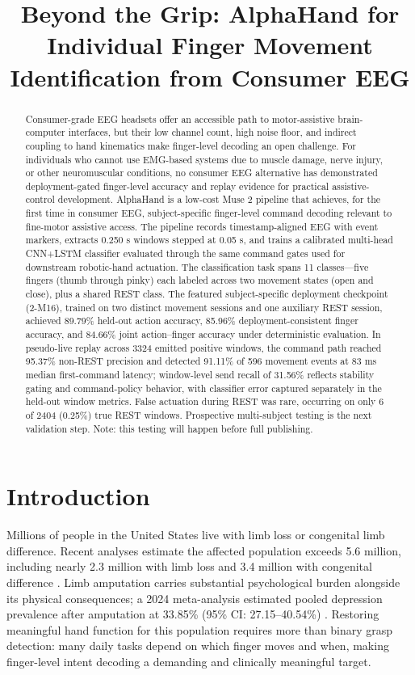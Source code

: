 \documentclass[conference]{IEEEtran}
\title{
Beyond the Grip:
AlphaHand for Individual Finger Movement Identification from Consumer EEG
}
\author{
\IEEEauthorblockN{\textbf{Jonathan Davanzo}}
\IEEEauthorblockA{
\normalfont\footnotesize First author and lead researcher\\
Summit High School\\
jonathandavanzo@alphahand.org}
\and
\IEEEauthorblockN{\textbf{Liam Bales}}
\IEEEauthorblockA{
\normalfont\footnotesize Summit High School\\
liam.c.bales@gmail.com}
\and
\IEEEauthorblockN{\textbf{Oliver Buchanan}}
\IEEEauthorblockA{
\normalfont\footnotesize Summit High School\\
oliverpbuchanan@icloud.com}
}
\begin{document}
\maketitle

\begin{abstract}
Consumer-grade EEG headsets offer an accessible path to motor-assistive brain-computer interfaces, but their low channel count, high noise floor, and indirect coupling to hand kinematics make finger-level decoding an open challenge. For individuals who cannot use EMG-based systems due to muscle damage, nerve injury, or other neuromuscular conditions, no consumer EEG alternative has demonstrated deployment-gated finger-level accuracy and replay evidence for practical assistive-control development. AlphaHand is a low-cost Muse 2 pipeline that achieves, for the first time in consumer EEG, subject-specific finger-level command decoding relevant to fine-motor assistive access. The pipeline records timestamp-aligned EEG with event markers, extracts 0.250 s windows stepped at 0.05 s, and trains a calibrated multi-head CNN+LSTM classifier evaluated through the same command gates used for downstream robotic-hand actuation. The classification task spans 11 classes---five fingers (thumb through pinky) each labeled across two movement states (open and close), plus a shared REST class. The featured subject-specific deployment checkpoint (2-M16), trained on two distinct movement sessions and one auxiliary REST session, achieved 89.79\% held-out action accuracy, 85.96\% deployment-consistent finger accuracy, and 84.66\% joint action--finger accuracy under deterministic evaluation. In pseudo-live replay across 3324 emitted positive windows, the command path reached 95.37\% non-REST precision and detected 91.11\% of 596 movement events at 83 ms median first-command latency; window-level send recall of 31.56\% reflects stability gating and command-policy behavior, with classifier error captured separately in the held-out window metrics. False actuation during REST was rare, occurring on only 6 of 2404 (0.25\%) true REST windows. Prospective multi-subject testing is the next validation step. Note: this testing will happen before full publishing.
\end{abstract}

\section{Introduction}

Millions of people in the United States live with limb loss or congenital limb difference. Recent analyses estimate the affected population exceeds 5.6 million, including nearly 2.3 million with limb loss and 3.4 million with congenital difference \cite{Cain2025AmputeeCare}. Limb amputation carries substantial psychological burden alongside its physical consequences; a 2024 meta-analysis estimated pooled depression prevalence after amputation at 33.85\% (95\% CI: 27.15--40.54\%) \cite{Singh2024Depression}. Restoring meaningful hand function for this population requires more than binary grasp detection: many daily tasks depend on which finger moves and when, making finger-level intent decoding a demanding and clinically meaningful target.
\end{document}
